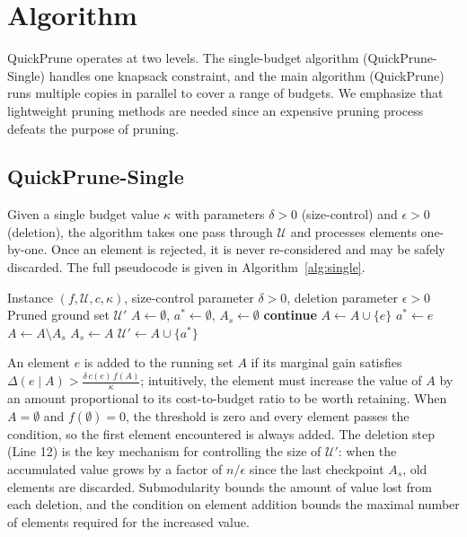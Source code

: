 \section{Algorithm}

QuickPrune operates at two levels. The single-budget algorithm (QuickPrune-Single)
handles one knapsack constraint, and the main algorithm (QuickPrune) runs multiple copies
in parallel to cover a range of budgets. We emphasize that lightweight pruning methods
are needed since an expensive pruning process defeats the purpose of pruning.

\subsection{QuickPrune-Single}

Given a single budget value $\kappa$ with parameters $\delta > 0$ (size-control) and
$\epsilon > 0$ (deletion), the algorithm takes one pass through $\mathcal{U}$ and
processes elements one-by-one. Once an element is rejected, it is never re-considered and
may be safely discarded. The full pseudocode is given in Algorithm~\ref{alg:single}.

\begin{algorithm}[t]
\caption{QuickPrune-Single: Pruning for a single constraint.}
\label{alg:single}
\begin{algorithmic}[1]
\REQUIRE Instance $(f, \mathcal{U}, c, \kappa)$, size-control parameter $\delta > 0$,
  deletion parameter $\epsilon > 0$
\ENSURE Pruned ground set $\mathcal{U}'$
\STATE $A \gets \emptyset$, $a^* \gets \emptyset$, $A_s \gets \emptyset$
    \STATE \textbf{continue}
  \ENDIF
    \STATE $A \gets A \cup \{e\}$
  \ENDIF
    \STATE $a^* \gets e$
  \ENDIF
    \STATE $A \gets A \setminus A_s$ \label{line:delete-set}
    \STATE $A_s \gets A$
  \ENDIF
\ENDFOR
\RETURN $\mathcal{U}' \gets A \cup \{a^*\}$
\end{algorithmic}
\end{algorithm}

An element $e$ is added to the running set $A$ if its marginal gain satisfies
$\Delta(e \mid A) > \frac{\delta \, c(e) \, f(A)}{\kappa}$; intuitively, the element
must increase the value of $A$ by an amount proportional to its cost-to-budget ratio to be
worth retaining. When $A = \emptyset$ and $f(\emptyset) = 0$, the threshold is zero and
every element passes the condition, so the first element encountered is always added. The deletion step (Line 12) is the key mechanism for controlling the size
of $\mathcal{U}'$: when the accumulated value grows by a factor of $n / \epsilon$ since
the last checkpoint $A_s$, old elements are discarded. Submodularity bounds the amount of
value lost from each deletion, and the condition on element addition bounds the maximal
number of elements required for the increased value.


